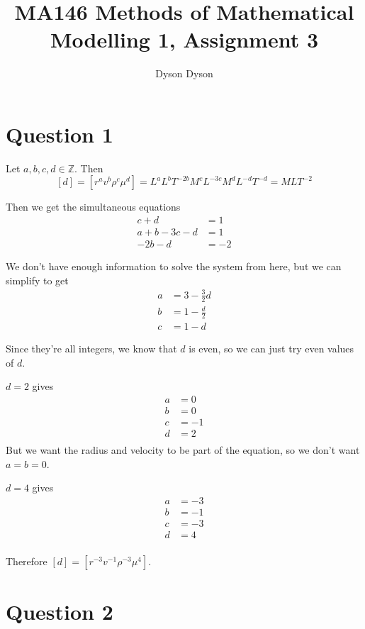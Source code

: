 \documentclass[a4paper]{article}
\title{MA146 Methods of Mathematical Modelling 1, Assignment 3}
\author{Dyson Dyson}
\date{}
\begin{document}
\maketitle

\setlength{\parindent}{0em}
\setlength{\parskip}{1em}


\section*{Question 1}

Let $a, b, c, d \in \mathbb Z$. Then $$[d] = \left[ r^a v^b \rho^c \mu^d \right] = L^a L^b T^{-2b} M^c L^{-3c} M^d L^{-d} T^{-d} = MLT^{-2}$$

Then we get the simultaneous equations \begin{align*}
	c + d &= 1\\
	a + b - 3c - d &= 1\\
	-2b - d &= -2
\end{align*}

We don't have enough information to solve the system from here, but we can simplify to get \begin{align*}
	a &= 3 - \frac32 d\\
	b &= 1 - \frac d2\\
	c &= 1 - d
\end{align*}

Since they're all integers, we know that $d$ is even, so we can just try even values of $d$.

$d=2$ gives \begin{align*}
	a &= 0\\
	b &= 0\\
	c &= -1\\
	d &= 2\\
\end{align*}
But we want the radius and velocity to be part of the equation, so we don't want $a=b=0$.

$d=4$ gives \begin{align*}
	a &= -3\\
	b &= -1\\
	c &= -3\\
	d &= 4\\
\end{align*}

Therefore $[d] = \left[ r^{-3} v^{-1} \rho^{-3} \mu^4 \right]$.


\section*{Question 2}
\setcounter{section}{2}
\setcounter{subsection}{0}
\end{document}
